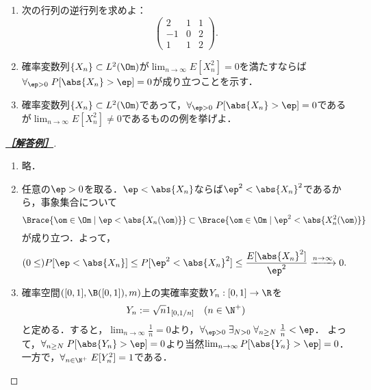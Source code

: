 \documentclass[uplatex,dvipdfmx]{jsarticle}
\begin{document}
\begin{tcolorbox}[colframe=ForestGreen, colback=ForestGreen!10!white,breakable,colbacktitle=ForestGreen!40!white,coltitle=black,fonttitle=\bfseries\sffamily,
    title=第１問]
    \begin{enumerate}
        \item 次の行列の逆行列を求めよ：
        \[\begin{pmatrix}2&1&1\\-1&0&2\\1&1&2\end{pmatrix}.\]
        \item 確率変数列$\{X_n\}\subset L^2(\Om)$が$\lim_{n\to\infty}E[X_n^2]=0$を満たすならば$\forall_{\ep>0}\;P[\abs{X_n}>\ep]=0$が成り立つことを示す．
        \item 確率変数列$\{X_n\}\subset L^2(\Om)$であって，$\forall_{\ep>0}\;P[\abs{X_n}>\ep]=0$であるが$\lim_{n\to\infty}E[X_n^2]\ne0$であるものの例を挙げよ．
    \end{enumerate}
\end{tcolorbox}
\begin{proof}[\textbf{\underline{［解答例］}}]\mbox{}
    \begin{enumerate}
        \item 略．
        \item 任意の$\ep>0$を取る．$\ep<\abs{X_n}$ならば$\ep^2<\abs{X_n}^2$であるから，事象集合について
        \[\Brace{\om\in\Om\mid\ep<\abs{X_n(\om)}}\subset\Brace{\om\in\Om\mid\ep^2<\abs{X_n^2(\om)}}\]
        が成り立つ．よって，
        \begin{align*}
            (0\le)P[\ep<\abs{X_n}]&\le P[\ep^2<\abs{X_n}^2]\le\frac{E[\abs{X_n}^2]}{\ep^2}\xrightarrow{n\to\infty}0.
        \end{align*}
        \item 確率空間$([0,1],\B([0,1]),m)$上の実確率変数$Y_n:[0,1]\to\R$を
        \[Y_n:=\sqrt{n}1_{[0,1/n]}\quad(n\in\N^+)\]
        と定める．すると，$\lim_{n\to\infty}\frac{1}{n}=0$より，$\forall_{\ep>0}\;\exists_{N>0}\;\forall_{n\ge N}\;\frac{1}{n}<\ep$．
        よって，$\forall_{n\ge N}\;P[\abs{Y_n}>\ep]=0$より当然$\lim_{n\to\infty}P[\abs{Y_n}>\ep]=0$．
        一方で，$\forall_{n\in\N^+}\;E[Y_n^2]=1$である．
    \end{enumerate}
\end{proof}
\end{document}
